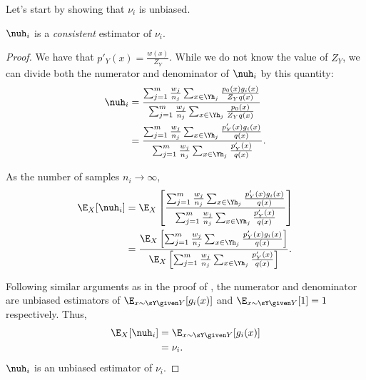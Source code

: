Let's start by showing that $\nu_i$ is unbiased.
\begin{theorem}
\label{thm:nuh}
  $\nuh_i$ is a \textit{consistent} estimator of $\nu_i$.
\end{theorem}
\begin{proof}
  We have that $p'_Y(x) = \frac{w(x)}{Z_Y}$.
  While we do not know the value of $Z_Y$, we can divide both the numerator and denominator of $\nuh_i$ by this quantity:
  \begin{align*}
    \nuh_i 
    &= \frac{\sum_{j=1}^m \frac{w_j}{n_j} \sum_{x \in \Yh_j} \frac{p_0(x) g_i(x)}{Z_Y q(x)}}{\sum_{j=1}^m \frac{w_j}{n_j} \sum_{x \in \Yh_j} \frac{p_0(x)}{Z_Y q(x)}} \\
    &= \frac{\sum_{j=1}^m \frac{w_j}{n_j} \sum_{x \in \Yh_j} \frac{p'_Y(x) g_i(x)}{q(x)}}{\sum_{j=1}^m \frac{w_j}{n_j} \sum_{x \in \Yh_j} \frac{p'_Y(x)}{q(x)}}.
  \end{align*}

  As the number of samples $n_i \to \infty$,
  \begin{align*}
    \E_{X}[\nuh_i] 
    &= \E_{X}\left[ \frac{\sum_{j=1}^m \frac{w_j}{n_j} \sum_{x \in \Yh_j} \frac{p'_Y(x) g_i(x)}{q(x)}}{\sum_{j=1}^m \frac{w_j}{n_j} \sum_{x \in \Yh_j} \frac{p'_Y(x)}{q(x)}} \right] \\
    &= \frac{\E_{X}\left[ \sum_{j=1}^m \frac{w_j}{n_j} \sum_{x \in \Yh_j} \frac{p'_Y(x) g_i(x)}{q(x)} \right]}
    {\E_{X}\left[\sum_{j=1}^m \frac{w_j}{n_j} \sum_{x \in \Yh_j} \frac{p'_Y(x)}{q(x)}\right]}.
  \end{align*}

  Following similar arguments as in the proof of , the numerator and denominator are unbiased estimators of $\E_{x \sim \sY \given Y}[g_i(x)]$ and $\E_{x \sim \sY \given Y}[1] = 1$ respectively.
  Thus,
  \begin{align*}
    \E_{X}[\nuh_i] 
    &= \E_{x \sim \sY \given Y}[g_i(x)] \\
    &= \nu_i.
  \end{align*}
  $\nuh_i$ is an unbiased estimator of $\nu_i$.

\end{proof}

